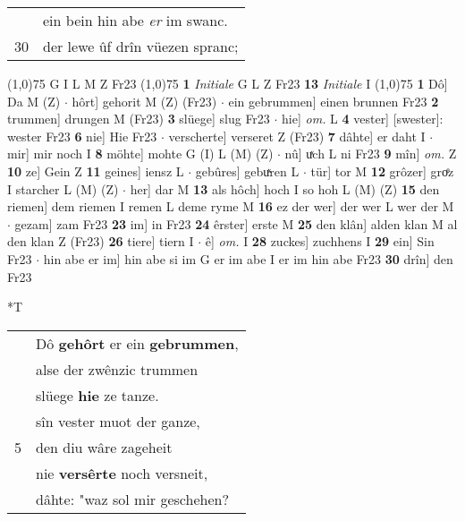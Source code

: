 \documentclass[8pt,a4paper,notitlepage]{article}
\begin{document}
\begin{table}[ht]
\begin{minipage}[t]{0.5\linewidth}
\begin{tabular}{rl}
 & ein bein hin abe \textit{er} im swanc.\\ 
30 & der lewe ûf drîn vüezen spranc;\\ 
\end{tabular}
\scriptsize
\line(1,0){75} \newline
G I L M Z Fr23 \newline
\line(1,0){75} \newline
\textbf{1} \textit{Initiale} G L Z Fr23  \textbf{13} \textit{Initiale} I  \newline
\line(1,0){75} \newline
\textbf{1} Dô] Da M (Z)  $\cdot$ hôrt] gehorit M (Z) (Fr23)  $\cdot$ ein gebrummen] einen brunnen Fr23 \textbf{2} trummen] drungen M (Fr23) \textbf{3} slüege] slug Fr23  $\cdot$ hie] \textit{om.} L \textbf{4} vester] [swester]: wester Fr23 \textbf{6} nie] Hie Fr23  $\cdot$ verscherte] verseret Z (Fr23) \textbf{7} dâhte] er daht I  $\cdot$ mir] mir noch I \textbf{8} möhte] mohte G (I) L (M) (Z)  $\cdot$ nû] uͯch L ni Fr23 \textbf{9} mîn] \textit{om.} Z \textbf{10} ze] Gein Z \textbf{11} geines] iensz L  $\cdot$ gebûres] gebuͯren L  $\cdot$ tür] tor M \textbf{12} grôzer] groͤz I starcher L (M) (Z)  $\cdot$ her] dar M \textbf{13} als hôch] hoch I so hoh L (M) (Z) \textbf{15} den riemen] dem riemen I remen L deme ryme M \textbf{16} ez der wer] der wer L wer der M  $\cdot$ gezam] zam Fr23 \textbf{23} im] in Fr23 \textbf{24} êrster] erste M \textbf{25} den klân] alden klan M al den klan Z (Fr23) \textbf{26} tiere] tiern I  $\cdot$ ê] \textit{om.} I \textbf{28} zuckes] zuchhens I \textbf{29} ein] Sin Fr23  $\cdot$ hin abe er im] hin abe si im G er im abe I er im hin abe Fr23 \textbf{30} drîn] den Fr23 \newline
\end{minipage}
\hspace{0.5cm}
\begin{minipage}[t]{0.5\linewidth}
\small
\begin{center}*T
\end{center}
\begin{tabular}{rl}
 & Dô \textbf{gehôrt} er ein \textbf{gebrummen},\\ 
 & alse der zwênzic trummen\\ 
 & slüege \textbf{hie} ze tanze.\\ 
 & sîn vester muot der ganze,\\ 
5 & den diu wâre zageheit\\ 
 & nie \textbf{versêrte} noch versneit,\\ 
 & dâhte: "waz sol mir geschehen?\\ 

\end{tabular}
\end{minipage}
\end{table}
\end{document}
